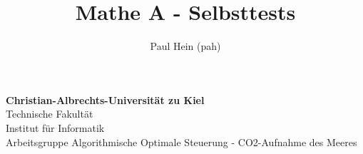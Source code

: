 \documentclass[12pt, oneside, a4paper] {scrartcl}
\author{Paul Hein (pah)}
\title{Mathe A - Selbsttests}
\theoremstyle{theorems}            %
\begin{document}
\begin{titlepage}
\begin{flushleft}
{\textbf{Christian-Albrechts-Universität zu Kiel}}\\
{\normalsize{ Technische Fakultät \\Institut für Informatik\\
Arbeitsgruppe Algorithmische Optimale Steuerung - CO2-Aufnahme des Meeres }}
\end{flushleft}

\vspace{3.5cm}


{\huge\begin{center}
{\textbf{\thetitle}}
\end{center}}

\begin{center}
{{\Large \theauthor}}
\end{center}

\end{titlepage}




%


%
\end{document}
